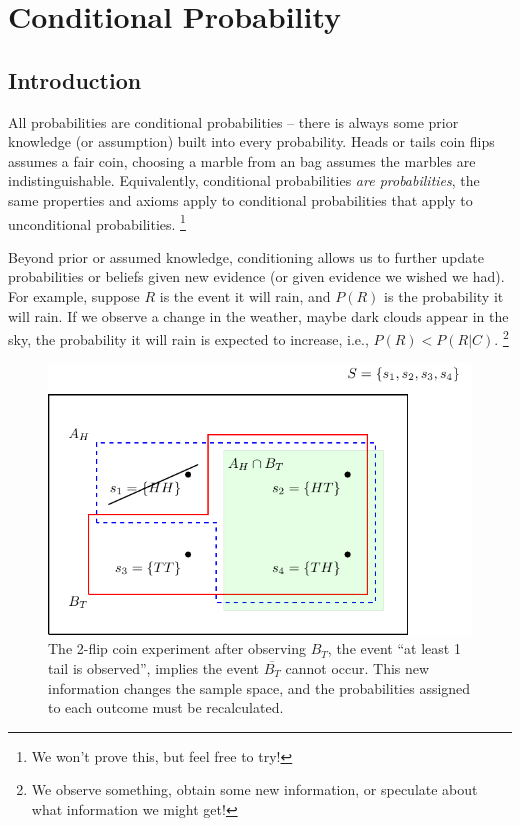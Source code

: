 


\maketitle
\clearpage

\section{Conditional Probability}

\subsection{Introduction}

All probabilities are conditional probabilities 
-- there is always some prior knowledge (or assumption) built 
into every probability. 
Heads or tails coin flips assumes a fair coin, 
choosing a marble from an bag assumes the marbles are indistinguishable.
Equivalently, 
conditional probabilities \emph{are probabilities}, 
the same properties and axioms apply to conditional probabilities that apply
to unconditional probabilities.%
\footnote{We won't prove this, but feel free to try!}

Beyond prior or assumed knowledge, 
conditioning allows us to further update probabilities 
or beliefs given new evidence (or given evidence we wished we had). 
For example, 
suppose \(R\) is the event it will rain, 
and \(P(R)\) is the probability it will rain. 
If we observe a change in the weather, 
maybe dark clouds appear in the sky, 
the probability it will rain is expected to increase,
i.e., \(P(R) < P(R|C)\).%
\footnote{We observe something, 
obtain some new information, 
or speculate about what information we might get!}

\begin{figure}[h!]
\centering
\includegraphics[width=0.75\linewidth]{tikz/figure1}
\caption{%
The 2-flip coin experiment after observing \(B_{T}\), 
the event ``at least 1 tail is observed'', 
implies the event \(\overline{B_{T}}\) cannot occur.
This new information changes the sample space, 
and the probabilities assigned to each outcome must be recalculated.%
}
\label{fig:conditioning}
\end{figure}

